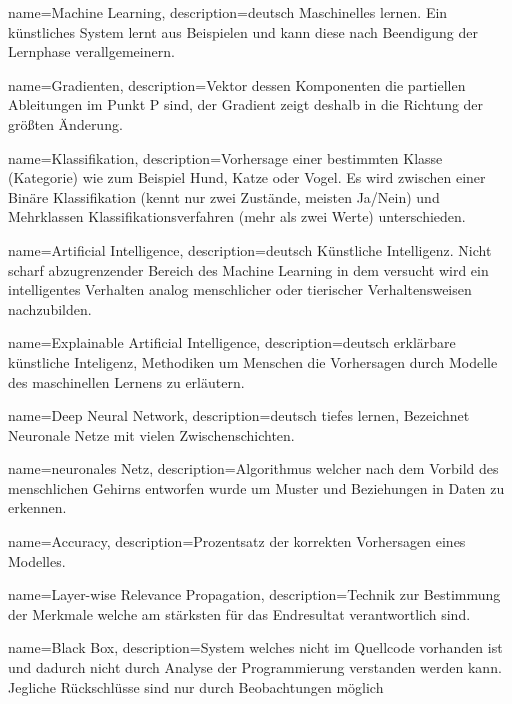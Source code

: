 
{
	name=Machine Learning,
	description={deutsch Maschinelles lernen. Ein künstliches System lernt aus Beispielen und kann diese nach Beendigung der Lernphase verallgemeinern. }
}

{
	name=Gradienten,
	description={Vektor dessen Komponenten die partiellen Ableitungen im Punkt P sind, der Gradient zeigt deshalb in die Richtung der größten Änderung. }
}

{
	name=Klassifikation,
	description={Vorhersage einer bestimmten Klasse (Kategorie) wie zum Beispiel Hund, Katze oder Vogel. Es wird zwischen einer Binäre Klassifikation (kennt nur zwei Zustände, meisten Ja/Nein) und Mehrklassen Klassifikationsverfahren (mehr als zwei Werte) unterschieden.  }
}

{
	name=Artificial Intelligence,
	description={deutsch Künstliche Intelligenz. Nicht scharf abzugrenzender Bereich des Machine Learning in dem versucht wird ein intelligentes Verhalten
	 analog menschlicher oder tierischer Verhaltensweisen nachzubilden. }
}

{
	name=Explainable Artificial Intelligence,
	description={deutsch erklärbare künstliche Inteligenz, Methodiken um Menschen die Vorhersagen durch Modelle des maschinellen Lernens zu erläutern. }
}

{
    name=Deep Neural Network,
    description={deutsch tiefes lernen, Bezeichnet Neuronale Netze mit vielen Zwischenschichten.}
}

{
	name=neuronales Netz,
	description={Algorithmus welcher nach dem Vorbild des menschlichen Gehirns entworfen wurde um Muster und Beziehungen in Daten zu erkennen.}   
}   

{
	name=Accuracy,
	description={Prozentsatz der korrekten Vorhersagen eines Modelles.}   
}   

{
	name=Layer-wise Relevance Propagation,
	description={Technik zur Bestimmung der Merkmale welche am stärksten für das Endresultat verantwortlich sind.}                                   
}                          

{
	name=Black Box,
	description={System welches nicht im Quellcode vorhanden ist und dadurch nicht durch Analyse der Programmierung verstanden werden kann. Jegliche Rückschlüsse sind nur durch Beobachtungen möglich}                                   
}     

